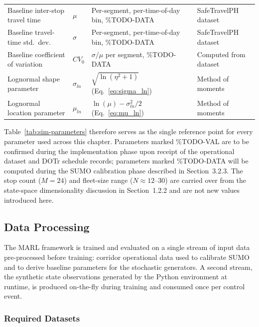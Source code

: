 \begin{table}[htbp]
\begin{tabularx}{\textwidth}{
>{\RaggedRight\arraybackslash}p{}
>{\RaggedRight\arraybackslash}p{}
X
>{\RaggedRight\arraybackslash}p{}
}
\midrule
\multicolumn{4}{l}{\textit{Derived parameters (from SUMO calibration)}} \\
\midrule

Baseline inter-stop travel time & $\mu$ & Per-segment, per-time-of-day bin, \%TODO-DATA & SafeTravelPH dataset \\
Baseline travel-time std.\ dev.\ & $\sigma$ & Per-segment, per-time-of-day bin, \%TODO-DATA & SafeTravelPH dataset \\
Baseline coefficient of variation & $CV_0$ & $\sigma/\mu$ per segment, \%TODO-DATA & Computed from dataset \\
Lognormal shape parameter & $\sigma_{ln}$ & $\sqrt{\ln(\eta^2+1)}$ (Eq.~\ref{eq:sigma_ln}) & Method of moments \\
Lognormal location parameter & $\mu_{ln}$ & $\ln(\mu) - \sigma_{ln}^2/2$ (Eq.~\ref{eq:mu_ln}) & Method of moments \\

\bottomrule
\end{tabularx}
\end{table}

Table~\ref{tab:sim-parameters} therefore serves as the single reference point for every parameter used across this chapter. Parameters marked \%TODO-VAL are to be confirmed during the implementation phase upon receipt of the operational dataset and DOTr schedule records; parameters marked \%TODO-DATA will be computed during the SUMO calibration phase described in Section~3.2.3. The stop count ($M=24$) and fleet-size range ($N \approx 12$--$30$) are carried over from the state-space dimensionality discussion in Section~1.2.2 and are not new values introduced here.

\subsection{Data Processing}

The MARL framework is trained and evaluated on a single stream of input data pre-processed before training: corridor operational data used to calibrate SUMO and to derive baseline parameters for the stochastic generators. A second stream, the synthetic state observations generated by the Python environment at runtime, is produced on-the-fly during training and consumed once per control event.

\subsubsection{Required Datasets}

